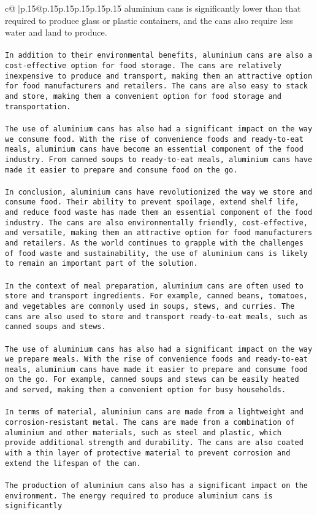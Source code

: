 \documentclass{article}
\begin{document}
{\begin{supertabular}{c@{$\;$}|p{.15\linewidth}@{}p{.15\linewidth}p{.15\linewidth}p{.15\linewidth}p{.15\linewidth}p{.15\linewidth}}
{{{aluminium cans is significantly lower than that required to produce glass or plastic containers, and the cans also require less water and land to produce.\\ \tt \\ \tt In addition to their environmental benefits, aluminium cans are also a cost-effective option for food storage. The cans are relatively inexpensive to produce and transport, making them an attractive option for food manufacturers and retailers. The cans are also easy to stack and store, making them a convenient option for food storage and transportation.\\ \tt \\ \tt The use of aluminium cans has also had a significant impact on the way we consume food. With the rise of convenience foods and ready-to-eat meals, aluminium cans have become an essential component of the food industry. From canned soups to ready-to-eat meals, aluminium cans have made it easier to prepare and consume food on the go.\\ \tt \\ \tt In conclusion, aluminium cans have revolutionized the way we store and consume food. Their ability to prevent spoilage, extend shelf life, and reduce food waste has made them an essential component of the food industry. The cans are also environmentally friendly, cost-effective, and versatile, making them an attractive option for food manufacturers and retailers. As the world continues to grapple with the challenges of food waste and sustainability, the use of aluminium cans is likely to remain an important part of the solution.\\ \tt \\ \tt In the context of meal preparation, aluminium cans are often used to store and transport ingredients. For example, canned beans, tomatoes, and vegetables are commonly used in soups, stews, and curries. The cans are also used to store and transport ready-to-eat meals, such as canned soups and stews.\\ \tt \\ \tt The use of aluminium cans has also had a significant impact on the way we prepare meals. With the rise of convenience foods and ready-to-eat meals, aluminium cans have made it easier to prepare and consume food on the go. For example, canned soups and stews can be easily heated and served, making them a convenient option for busy households.\\ \tt \\ \tt In terms of material, aluminium cans are made from a lightweight and corrosion-resistant metal. The cans are made from a combination of aluminium and other materials, such as steel and plastic, which provide additional strength and durability. The cans are also coated with a thin layer of protective material to prevent corrosion and extend the lifespan of the can.\\ \tt \\ \tt The production of aluminium cans also has a significant impact on the environment. The energy required to produce aluminium cans is significantly }}}
\end{supertabular}}
\end{document}

